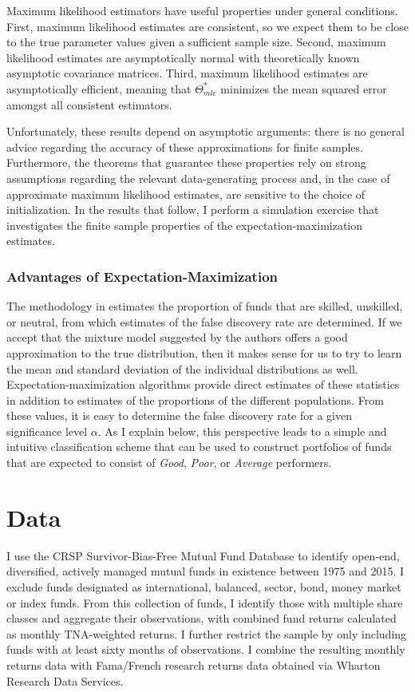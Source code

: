 		Maximum likelihood estimators have useful properties under general conditions. First, maximum likelihood estimates are consistent, so we expect them to be close to the true parameter values given a sufficient sample size. Second, maximum likelihood estimates are asymptotically normal with theoretically known asymptotic covariance matrices. Third, maximum likelihood estimates are asymptotically efficient, meaning that $\Theta_{mle}^*$ minimizes the mean squared error amongst all consistent estimators.

		Unfortunately, these results depend on asymptotic arguments: there is no general advice regarding the accuracy of these approximations for finite samples. Furthermore, the theorems that guarantee these properties rely on strong assumptions regarding the relevant data-generating process and, in the case of approximate maximum likelihood estimates, are sensitive to the choice of initialization.  In the results that follow, I perform a simulation exercise that investigates the finite sample properties of the expectation-maximization estimates.

		\subsubsection{Advantages of Expectation-Maximization}
			The methodology in \citet{Barras2010} estimates the proportion of funds that are skilled, unskilled, or neutral, from which estimates of the false discovery rate are determined. If we accept that the mixture model suggested by the authors offers a good approximation to the true distribution, then it makes sense for us to try to learn the mean and standard deviation of the individual distributions as well. Expectation-maximization algorithms provide direct estimates of these statistics in addition to estimates of the proportions of the different populations. From these values, it is easy to determine the false discovery rate for a given significance level $\alpha$. As I explain below, this perspective leads to a simple and intuitive classification scheme that can be used to construct portfolios of funds that are expected to consist of \textit{Good}, \textit{Poor}, or \textit{Average} performers.


\section{Data}
	I use the CRSP Survivor-Bias-Free Mutual Fund Database to identify open-end, diversified, actively managed mutual funds in existence between 1975 and 2015. I exclude funds designated as international, balanced, sector, bond, money market or index funds. From this collection of funds, I identify those with multiple share classes and aggregate their observations, with combined fund returns calculated as monthly TNA-weighted returns. I further restrict the sample by only including funds with at least sixty months of observations. I combine the resulting monthly returns data with Fama/French research returns data obtained via Wharton Research Data Services.

